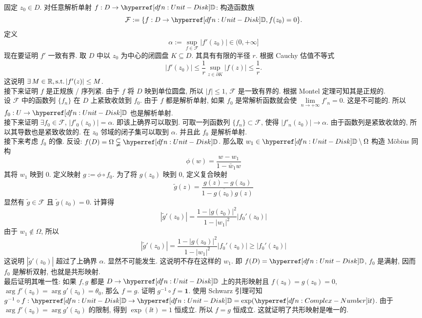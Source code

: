         \begin{prf}
            固定 \(z_0\in D\). 对任意解析单射 \(f:D\to\D\): 构造函数族
            \[\mathcal{F}:=\{f:D\to\D,f(z_0)=0 \}.\]
            定义 
            \[\alpha:=\sup_{f\in\mathcal{F}}|f'(z_0)|\in(0,+\infty]\]
            现在要证明 \(f'\) 一致有界. 取 \(D\) 中以 \(z_0\) 为中心的闭圆盘 \(K\subseteq D\). 其具有有限的半径 \(r\). 根据 Cauchy 估值不等式
            \[|f'(z_0)|\leq\frac{1}{r}\sup_{z\in\partial K}|f(z)|\leq \frac{1}{r}. \]
            这说明 \(\exists\,M\in\operatorname{\mathbb{R}},\operatorname{\text{s.t.}} |f'(z)|\leq M\).\\
            接下来证明 \(f\) 是正规族 / 序列紧. 由于 \(f\) 将 \(D\) 映到单位圆盘, 所以 \(|f|\leq 1\), \(\mathcal{F}\) 是一致有界的. 根据 Montel 定理可知其是正规的. \\
            设 \(\mathcal{F}\) 中的函数列 \(\{f_n\}\) 在 \(D\) 上紧致收敛到 \(f_0\). 由于 \(f\) 都是解析单射, 如果 \(f_0\) 是常解析函数就会使 \(\lim\limits_{n\to+\infty}f'_n=0\). 这是不可能的. 所以 \(f_0:U\to\D\) 也是解析单射.\\
            接下来证明 \(\exists f_0\in\mathcal{F}\), \(|f'_0(z_0)|=\alpha\). 即该上确界可以取到. 可取一列函数列 \(\{f_n\}\subset\mathcal{F}\), 使得 \(|f'_n(z_0)|\to\alpha\). 由于函数列是紧致收敛的, 所以其导数也是紧致收敛的. 在 \(z_0\) 邻域的闭子集可以取到 \(\alpha\). 并且此 \(f_0\) 是解析单射.\\
            接下来考虑 \(f_0\) 的像. 反设: \(f(D)=\Omega\subsetneqq\D\). 那么取 \(w_1\in\D\setminus\Omega\) 构造 M\"obius 同构
            \[\phi(w)=\frac{w-w_1}{1-\bar{w}_1w}\]
            其将 \(w_1\) 映到 \(0\). 定义映射 \(g:=\phi\circ f_0\). 为了将 \(g(z_0)\) 映到 \(0\), 定义复合映射
            \[\tilde{g}(z)=\frac{g(z)-g(z_0)}{1-\overline{g(z_0)}g(z)}\]
            显然有 \(\tilde{g}\in\mathcal{F}\) 且 \(\tilde{g}(z_0)=0\). 计算得
            \[|\tilde{g}'(z_0)|=\frac{1-|g(z_0)|^2}{1-|w_1|^2}|f_0'(z_0)|\]
            由于 \(w_1\notin\Omega \), 所以 
            \[|\tilde{g}'(z_0)|=\frac{1-|g(z_0)|^2}{1-|w_1|^2}|f_0'(z_0)|\geq |f_0'(z_0)|\]
            这说明 \(|\tilde{g}'(z_0)|\) 超过了上确界 \(\alpha\). 显然不可能发生. 这说明不存在这样的 \(w_1\). 即 \(f(D)=\D\), \(f_0\) 是满射, 因而 \(f_0\) 是解析双射, 也就是共形映射.\\
            最后证明其唯一性: 如果 \(f,g\) 都是 \(D\to\D\) 上的共形映射且 \(f(z_0)=g(z_0)=0\), \(\arg f'(z_0)=\arg g'(z_0)=\theta_0\), 那么 \(f=g\). 证明 \(g^{-1}\circ f=\mathbf{1}\). 使用 Schwarz 引理可知 \(g^{-1}\circ f:\D\to\D=\exp(\ii t)\). 由于 \(\arg f'(z_0)=\arg g'(z_0)\) 的限制, 得到 \(\exp(\ii t)=1\) 恒成立. 所以 \(f=g\) 恒成立. 这就证明了共形映射是唯一的.
        \end{prf}

